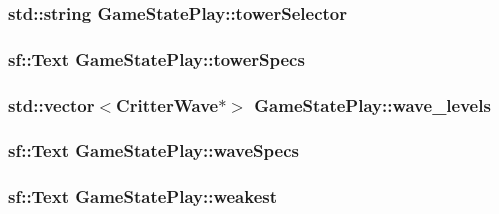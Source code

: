 \hypertarget{class_game_state_play_acfd6271509da5b9cec7ed2904b3ad33a}{
\subsubsection[{tower\+Selector}]{\setlength{\rightskip}{0pt plus 5cm}std\+::string Game\+State\+Play\+::tower\+Selector\hspace{0.3cm}{\ttfamily [private]}}}\label{class_game_state_play_acfd6271509da5b9cec7ed2904b3ad33a}
\hypertarget{class_game_state_play_add98cf58c2cc6af809cade72be6c6c0a}{
\subsubsection[{tower\+Specs}]{\setlength{\rightskip}{0pt plus 5cm}sf\+::\+Text Game\+State\+Play\+::tower\+Specs\hspace{0.3cm}{\ttfamily [private]}}}\label{class_game_state_play_add98cf58c2cc6af809cade72be6c6c0a}
\hypertarget{class_game_state_play_a97b5c39127688b4c5ddb147572f77290}{
\subsubsection[{wave\+\_\+levels}]{\setlength{\rightskip}{0pt plus 5cm}std\+::vector$<${\bf Critter\+Wave}$\ast$$>$ Game\+State\+Play\+::wave\+\_\+levels\hspace{0.3cm}{\ttfamily [private]}}}\label{class_game_state_play_a97b5c39127688b4c5ddb147572f77290}
\hypertarget{class_game_state_play_a61669dc94331d0302f3a0f5792304049}{
\subsubsection[{wave\+Specs}]{\setlength{\rightskip}{0pt plus 5cm}sf\+::\+Text Game\+State\+Play\+::wave\+Specs\hspace{0.3cm}{\ttfamily [private]}}}\label{class_game_state_play_a61669dc94331d0302f3a0f5792304049}
\hypertarget{class_game_state_play_aa528568bfe4f5fcc79605557c6d0d12d}{
\subsubsection[{weakest}]{\setlength{\rightskip}{0pt plus 5cm}sf\+::\+Text Game\+State\+Play\+::weakest\hspace{0.3cm}{\ttfamily [private]}}}\label{class_game_state_play_aa528568bfe4f5fcc79605557c6d0d12d}


